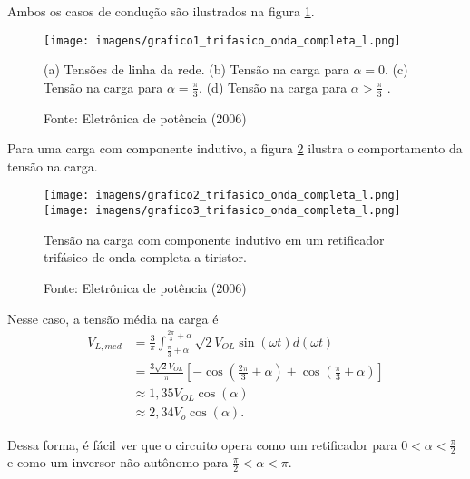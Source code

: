 Ambos os casos de condução são ilustrados na figura \ref{g1tcl}.

\begin{figure}[h]
\center
\texttt{[image: imagens/grafico1\_trifasico\_onda\_completa\_l.png]}
\caption{(a) Tensões de linha da rede. (b) Tensão na carga para $\alpha =0$. (c) Tensão na carga para $\alpha = \frac{\pi}{3}$. (d) Tensão na carga para $\alpha>\frac{\pi}{3}$ .} \label{g1tcl} 
\caption*{Fonte: Eletrônica de potência (2006)}
\end{figure}

Para uma carga com componente indutivo, a figura \ref{g2tcl} ilustra o comportamento da tensão na carga.

\begin{figure}[h]
\center
\texttt{[image: imagens/grafico2\_trifasico\_onda\_completa\_l.png]}
\texttt{[image: imagens/grafico3\_trifasico\_onda\_completa\_l.png]}
\caption{Tensão na carga com componente indutivo em um retificador trifásico de onda completa a tiristor.} \label{g2tcl} 
\caption*{Fonte: Eletrônica de potência (2006)}
\end{figure}

Nesse caso, a tensão média na carga é
\begin{align*}
    V_{L,med} &= \frac{3}{\pi}\int_{\frac{\pi}{3}+\alpha}^{\frac{2\pi}{3}+\alpha}\sqrt{2}V_{OL}\sin(\omega{t})d(\omega{t})\\
	      &= \frac{3\sqrt{2}V_{OL}}{\pi}\left[-\cos\left(\frac{2\pi}{3}+\alpha\right) +\cos\left(\frac{\pi}{3}+\alpha\right) \right] \\
&\approx 1,35V_{OL}\cos(\alpha)\\
&\approx 2,34V_{o}\cos(\alpha)
.\end{align*}

Dessa forma, é fácil ver que o circuito opera como um retificador para $0<\alpha<\frac{\pi}{2}$ e como um inversor não autônomo para $\frac{\pi}{2}<\alpha<\pi$.


